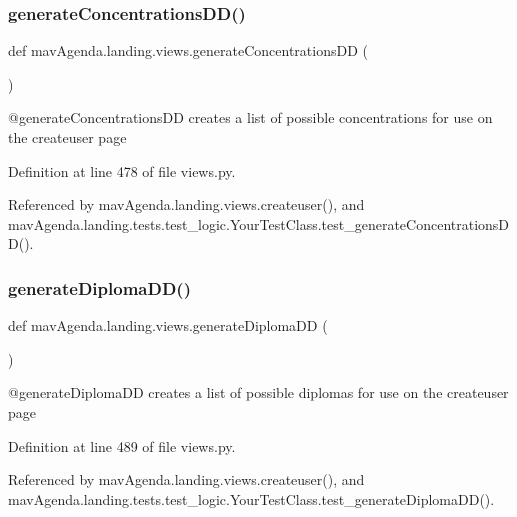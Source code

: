 \subsubsection{\texorpdfstring{generate\+Concentrations\+D\+D()}{generateConcentrationsDD()}}
{\footnotesize\ttfamily def mav\+Agenda.\+landing.\+views.\+generate\+Concentrations\+DD (\begin{DoxyParamCaption}{ }\end{DoxyParamCaption})}

\begin{DoxyVerb}@generateConcentrationsDD creates a list of possible concentrations for use on the createuser page
\end{DoxyVerb}
 

Definition at line 478 of file views.\+py.



Referenced by mav\+Agenda.\+landing.\+views.\+createuser(), and mav\+Agenda.\+landing.\+tests.\+test\+\_\+logic.\+Your\+Test\+Class.\+test\+\_\+generate\+Concentrations\+D\+D().

\mbox{\label{namespacemavAgenda_1_1landing_1_1views_a105948cc4eeb1f721d86f670a3020470}} 
\subsubsection{\texorpdfstring{generate\+Diploma\+D\+D()}{generateDiplomaDD()}}
{\footnotesize\ttfamily def mav\+Agenda.\+landing.\+views.\+generate\+Diploma\+DD (\begin{DoxyParamCaption}{ }\end{DoxyParamCaption})}

\begin{DoxyVerb}@generateDiplomaDD creates a list of possible diplomas for use on the createuser page
\end{DoxyVerb}
 

Definition at line 489 of file views.\+py.



Referenced by mav\+Agenda.\+landing.\+views.\+createuser(), and mav\+Agenda.\+landing.\+tests.\+test\+\_\+logic.\+Your\+Test\+Class.\+test\+\_\+generate\+Diploma\+D\+D().


